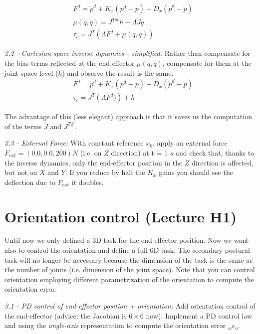 \documentclass[11pt]{article}
\begin{document}
\begin{align}
&F^d = \ddot{p}^d + K_x(p^d - p) + D_x(\dot{p}^d -\dot{p})  \\
&\mu(q,\dot{q})  = J^{T\#} h -\Lambda \dot{J} \dot{q} \\
&\tau_c  = J^T\left( \Lambda F^d +  \mu(q,\dot{q}) \right)
\end{align}


\quad

\noindent
\textit{2.2 - Cartesian space inverse dynamics - simplified:}
Rather than compensate for the bias terms reflected at the end-effector $\mu(q,\dot{q})$,  compensate for them at the joint space level ($h$) and observe the result is the same. 
\begin{align}
&F^d = \ddot{p}^d + K_x(p^d - p) + D_x(\dot{p}^d -\dot{p})  \\
&\tau_c  = J^T\left( \Lambda F^d ) \right) + h
\end{align}

The advantage of this (less elegant) approach is that it saves us the computation of the terms $\dot{J}$ and $J^{T\#}$.

\quad

\noindent
\textit{2.3 - External Force:}
With constant reference $x_0$,  apply an external force  $F_{ext} =(0.0,0.0,200) N$ (i.e. on 
$Z$ direction) at t = 1 $s$ and check that, thanks to the inverse dynamics, 
only the end-effector position in the $Z$ direction is affected, but not on $X$ and $Y$. 
If you reduce by half the $K_x$ gains you should see the deflection due to $F_{ext}$ it doubles.


\section{Orientation control (Lecture H1)}

Until now we only defined a 3D task for the end-effector position. Now we want also to control the orientation and define a full 6D task. 
The secondary postural task will no longer be necessary because the dimension of the task is the same as the number of joints (i.e. dimension of the joint space). Note that you can control orientation employing different parametrization of the orientation to compute the orientation error. 

\quad

\noindent
\textit{3.1 - PD control of end-effector position + orientation:}
Add orientation  control of the end-effector (advice: the Jacobian is $6\times6$ now). Implement a PD control law and using the \textit{angle-axis} representation to compute the orientation error ${}_we_o$. 
\end{document}
